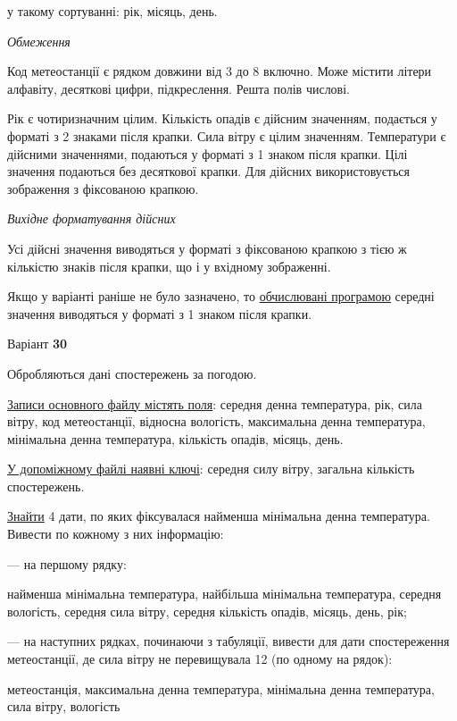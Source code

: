 \documentclass[11pt, ukrainian]{article}
\begin{document}
{\noindent}у такому сортуванні: рік, місяць, день.


\bigskip\textit{Обмеження}

Код метеостанції є рядком довжини від 3 до 8 включно.
Може містити літери алфавіту, десяткові цифри, підкреслення. Решта полів числові.

Рік є чотиризначним цілим.
Кількість опадів є дійсним значенням, подається у форматі з 2 знаками після крапки.
Сила вітру є цілим значенням.
Температури є дійсними значеннями, подаються у форматі з 1 знаком після крапки.
Цілі значення подаються без десяткової крапки.
Для дійсних використовується зображення з фіксованою крапкою.

\textit{Вихідне форматування дійсних}

Усі дійсні значення виводяться у форматі з фіксованою крапкою з тією ж кількістю знаків після крапки, що і у вхідному зображенні.

Якщо у варіанті раніше не було зазначено, то \underline{обчислювані програмою} середні значення виводяться у форматі з 1 знаком після крапки.


\par
\newpage
{\center Варіант  \No \textbf { 30 }\par}
\bigskip
Обробляються дані спостережень за погодою. 

\underline{Записи основного файлу містять поля}: середня денна температура, рік, сила вітру, код метеостанції, відносна вологість, максимальна денна температура, мінімальна денна температура, кількість опадів, місяць, день.

\underline{У допоміжному файлі наявні ключі}: середня силу вітру, загальна кількість спостережень.

\underline{Знайти} 4 дати, по яких фіксувалася найменша мінімальна  денна температура. Вивести по кожному з них інформацію:\par
{\noindent}--- на першому рядку:\par
найменша мінімальна температура, найбільша мінімальна температура, середня вологість, середня сила вітру, середня кількість опадів, місяць, день, рік;

{\noindent}--- на наступних рядках, починаючи з табуляції, вивести для дати спостереження метеостанції, де сила вітру не перевищувала 12 (по одному на рядок):\par
метеостанція, максимальна денна температура, мінімальна денна температура, сила вітру, вологість
\end{document}
